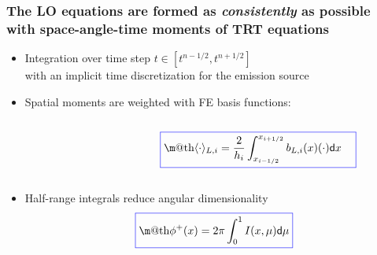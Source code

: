 \documentclass[xcolor=dvipsnames,hyperref={pdfpagelabels=false},unknownkeysallowed]{beamer}
\makeatletter
\newcommand*{\boxedcolor}{blue}
\renewcommand{\boxed}[1]{\textcolor{\boxedcolor}{%
  \fbox{\normalcolor\m@th$\displaystyle#1$}}}
\newcommand{\colb}[1]{{\color{blue} #1}}
\newcommand{\colG}[1]{{\color{Gray!110} #1}}
\newlength{\wideitemsep}
\let\olditem\item
\renewcommand{\item}{\setlength{\itemsep}{\wideitemsep}\olditem}
\renewcommand{\d}{\mathsf{d}}
\newcommand{\mom}[1]{\langle #1 \rangle}
\newcommand{\il}{{i-1/2}}
\newcommand{\ir}{{i+1/2}}
\makeatother
\begin{document}
\begin{frame}
    \frametitle{The LO equations are formed as \emph{consistently} as possible
        \\ with space-angle-time moments of TRT equations}
    \begin{itemize} \vspace{0.15in}
        \item[] Integration over time step $t \in [t^{n-1/2},t^{n+1/2}]$ \\ \colG{with an implicit
            time discretization for the emission source}
        \item[] Spatial moments are weighted with FE basis functions:   \end{itemize}
    \begin{columns}
        \begin{column}{0.5\textwidth}
    \begin{centering}
    \end{centering}
        \end{column}
        \begin{column}{0.5\textwidth}
        \begin{equation*}
        \boxed{\displaystyle \mom{\cdot}_{L,i} = \frac{2}{h_i} \int_{x_\il}^{x_\ir}
        b_{L,i}(x)(\cdot) \d x \quad }  
        \end{equation*}
    \end{column}
\end{columns}
\begin{itemize}
        \vspace{0.2in}
    \item[] Half-range integrals reduce angular dimensionality
    \begin{equation*}
        \boxed{{\displaystyle \phi^+(x) =
        2\pi\int_0^1 I(x,\mu) \d \mu}}
    \end{equation*}
\end{itemize}
\end{frame}
\end{document}
